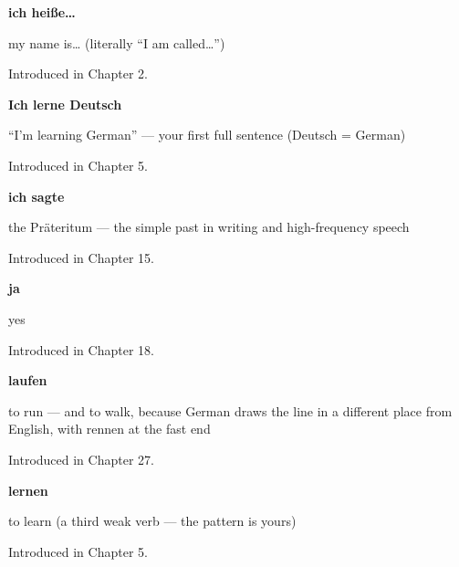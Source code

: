 \noindent\begin{minipage}[t]{\linewidth}
\raggedright
\textbf{ich heiße…}\par
\small my name is… (literally \textquotedblleft{}I am called…\textquotedblright{})\par
\footnotesize Introduced in Chapter 2.
\end{minipage}\par\medskip

\noindent\begin{minipage}[t]{\linewidth}
\raggedright
\textbf{Ich lerne Deutsch}\par
\small \textquotedblleft{}I'm learning German\textquotedblright{} — your first full sentence (Deutsch = German)\par
\footnotesize Introduced in Chapter 5.
\end{minipage}\par\medskip

\noindent\begin{minipage}[t]{\linewidth}
\raggedright
\textbf{ich sagte}\par
\small the Präteritum — the simple past in writing and high-frequency speech\par
\footnotesize Introduced in Chapter 15.
\end{minipage}\par\medskip

\noindent\begin{minipage}[t]{\linewidth}
\raggedright
\textbf{ja}\par
\small yes\par
\footnotesize Introduced in Chapter 18.
\end{minipage}\par\medskip

\noindent\begin{minipage}[t]{\linewidth}
\raggedright
\textbf{laufen}\par
\small to run — and to walk, because German draws the line in a different place from English, with rennen at the fast end\par
\footnotesize Introduced in Chapter 27.
\end{minipage}\par\medskip

\noindent\begin{minipage}[t]{\linewidth}
\raggedright
\textbf{lernen}\par
\small to learn (a third weak verb — the pattern is yours)\par
\footnotesize Introduced in Chapter 5.
\end{minipage}\par\medskip

